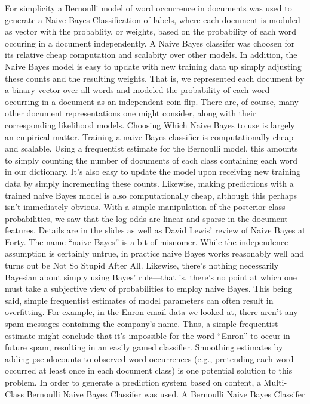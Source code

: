 \documentclass[11pt]{article}
\begin{document}
For simplicity a Bernoulli model of word occurrence in documents was used to generate a Naive Bayes Classification of labels, where each document is moduled as vector with the probablity, or weights, based on the probability of each word occuring in a document independently.  A Naive Bayes classifer was choosen for its relative cheap computation and scalabity over other models. In addition, the Naive Bayes model is easy to update with new training data up simply adjusting these counts and the resulting weights.  
That is, we represented each document by a binary vector over all words and modeled the probability of each word occurring in a document as an independent coin flip. There are, of course, many other document representations one might consider, along with their corresponding likelihood models. Choosing Which Naive Bayes to use is largely an empirical matter.
Training a naive Bayes classifier is computationally cheap and scalable. Using a frequentist estimate for the Bernoulli model, this amounts to simply counting the number of documents of each class containing each word in our dictionary. It’s also easy to update the model upon receiving new training data by simply incrementing these counts.
Likewise, making predictions with a trained naive Bayes model is also computationally cheap, although this perhaps isn’t immediately obvious. With a simple manipulation of the posterior class probabilities, we saw that the log-odds are linear and sparse in the document features. Details are in the slides as well as David Lewis’ review of Naive Bayes at Forty.
The name “naive Bayes” is a bit of misnomer. While the independence assumption is certainly untrue, in practice naive Bayes works reasonably well and turns out be Not So Stupid After All. Likewise, there’s nothing necessarily Bayesian about simply using Bayes’ rule—that is, there’s no point at which one must take a subjective view of probabilities to employ naive Bayes.
This being said, simple frequentist estimates of model parameters can often result in overfitting. For example, in the Enron email data we looked at, there aren’t any spam messages containing the company’s name. Thus, a simple frequentist estimate might conclude that it’s impossible for the word “Enron” to occur in future spam, resulting in an easily gamed classifier. Smoothing estimates by adding pseudocounts to observed word occurrences (e.g., pretending each word occurred at least once in each document class) is one potential solution to this problem.
In order to generate a prediction system based on content, a Multi-Class Bernoulli Naive Bayes Classifer was used.  A Bernoulli Naive Bayes Classifer
\end{document}
